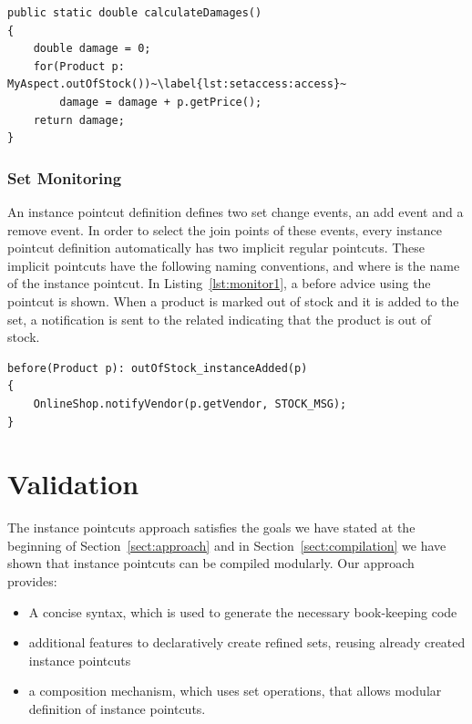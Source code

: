 \begin{lstlisting}[float=h!, caption={Calculate a damage estimate for out of stock products}, label={lst:setaccess}]
public static double calculateDamages()
{
	double damage = 0;
	for(Product p: MyAspect.outOfStock())~\label{lst:setaccess:access}~
		damage = damage + p.getPrice();
	return damage;
}
\end{lstlisting}



\subsubsection{Set Monitoring}
An instance pointcut definition defines two set change events, an add event and a remove event. In order to select the join points of these events, every instance pointcut definition automatically has two implicit regular pointcuts. These implicit pointcuts have the following naming conventions,  and  where  is the name of the instance pointcut. In Listing~\ref{lst:monitor1}, a before advice using the  pointcut is shown. 
When a product is marked out of stock and it is added to the set, a notification is sent to the related  indicating that the product is out of stock.

\begin{lstlisting}[float=h!, caption={Set monitoring pointcut used to notify vendors}, label={lst:monitor1}]
before(Product p): outOfStock_instanceAdded(p)
{
	OnlineShop.notifyVendor(p.getVendor, STOCK_MSG);
}
\end{lstlisting}




\section{Validation}
\label{sect:checking}
The instance pointcuts approach satisfies the goals we have stated at the beginning of Section~\ref{sect:approach} and in Section~\ref{sect:compilation} we have shown that instance pointcuts can be compiled modularly. 
Our approach provides:

\begin{itemize}
\item A concise syntax, which is used to generate the necessary book-keeping code
\item additional features to declaratively create refined sets, reusing already created instance pointcuts
\item a composition mechanism, which uses set operations, that allows modular definition of instance pointcuts.
\end{itemize}

